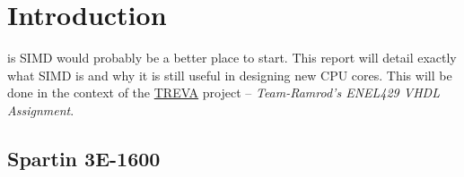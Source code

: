 \section{Introduction}

 is SIMD would probably be a better place to start.  This
report will detail exactly what SIMD is and why it is still useful in designing
new CPU cores.  This will be done in the context of the
\href{https://github.com/team-ramrod/treva}{TREVA} project --
\emph{Team-Ramrod's ENEL429 VHDL Assignment}.

\cite{picoblaze}


\subsection{Spartin 3E-1600} %

